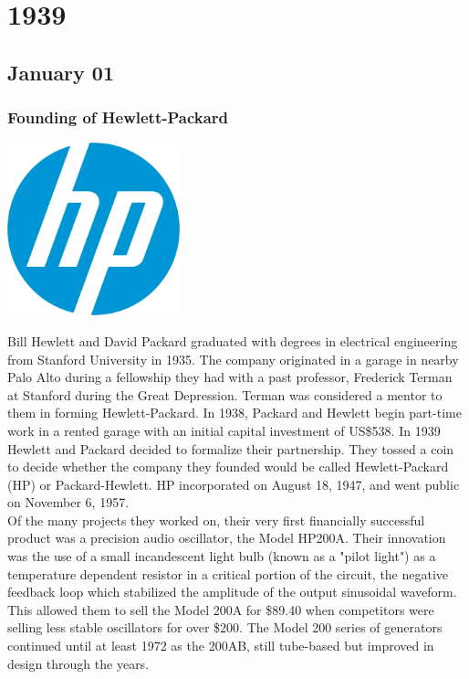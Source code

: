 \documentclass[11pt]{report}
\begin{document}
\chapter{1939}
\section{January 01}
\subsection{Founding of Hewlett-Packard}
\vspace{2mm}\begin{center}\includegraphics[width=5cm]{./img/hpLogo.jpg}\end{center}
Bill Hewlett and David Packard graduated with degrees in electrical engineering from Stanford University in 1935. The company originated in a garage in nearby Palo Alto during a fellowship they had with a past professor, Frederick Terman at Stanford during the Great Depression. Terman was considered a mentor to them in forming Hewlett-Packard. In 1938, Packard and Hewlett begin part-time work in a rented garage with an initial capital investment of US\$538. In 1939 Hewlett and Packard decided to formalize their partnership. They tossed a coin to decide whether the company they founded would be called Hewlett-Packard (HP) or Packard-Hewlett. HP incorporated on August 18, 1947, and went public on November 6, 1957.\\
\indent Of the many projects they worked on, their very first financially successful product was a precision audio oscillator, the Model HP200A. Their innovation was the use of a small incandescent light bulb (known as a "pilot light") as a temperature dependent resistor in a critical portion of the circuit, the negative feedback loop which stabilized the amplitude of the output sinusoidal waveform. This allowed them to sell the Model 200A for \$89.40 when competitors were selling less stable oscillators for over \$200. The Model 200 series of generators continued until at least 1972 as the 200AB, still tube-based but improved in design through the years.
\end{document}
